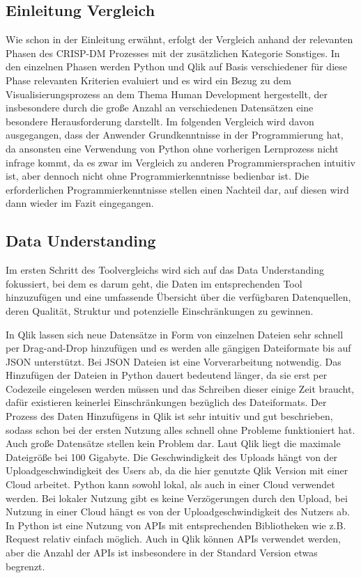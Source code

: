\documentclass[12pt]{article}
\begin{document}
	\subsection{Einleitung Vergleich}
	Wie schon in der Einleitung erwähnt, erfolgt der Vergleich anhand der relevanten Phasen des CRISP-DM Prozesses mit der zusätzlichen Kategorie Sonstiges. In den einzelnen Phasen werden Python und Qlik auf Basis verschiedener für diese Phase relevanten Kriterien evaluiert und es wird ein Bezug zu dem Visualisierungsprozess an dem Thema Human Development hergestellt, der insbesondere durch die große Anzahl an verschiedenen Datensätzen eine besondere Herausforderung darstellt. Im folgenden Vergleich wird davon ausgegangen, dass der Anwender Grundkenntnisse in der Programmierung hat, da ansonsten eine Verwendung von Python ohne vorherigen Lernprozess nicht infrage kommt, da es zwar im Vergleich zu anderen Programmiersprachen intuitiv ist, aber dennoch nicht ohne Programmierkenntnisse bedienbar ist. Die erforderlichen Programmierkenntnisse stellen einen Nachteil dar, auf diesen wird dann wieder im Fazit eingegangen.
	
	\subsection{Data Understanding}
	Im ersten Schritt des Toolvergleichs wird sich auf das Data Understanding fokussiert, bei dem es darum geht, die Daten im entsprechenden Tool hinzuzufügen und eine umfassende Übersicht über die verfügbaren Datenquellen, deren Qualität, Struktur und potenzielle Einschränkungen zu gewinnen.

	In Qlik lassen sich neue Datensätze in Form von einzelnen Dateien sehr schnell per Drag-and-Drop hinzufügen und es werden alle gängigen Dateiformate bis auf JSON unterstützt. Bei JSON Dateien ist eine Vorverarbeitung notwendig. Das Hinzufügen der Dateien in Python dauert bedeutend länger, da sie erst per Codezeile eingelesen werden müssen und das Schreiben dieser einige Zeit braucht, dafür existieren keinerlei Einschränkungen bezüglich des Dateiformats.
	Der Prozess des Daten Hinzufügens in Qlik ist sehr intuitiv und gut beschrieben, sodass schon bei der ersten Nutzung alles schnell ohne Probleme funktioniert hat. Auch große Datensätze stellen kein Problem dar. Laut Qlik liegt die maximale Dateigröße bei 100 Gigabyte. Die Geschwindigkeit des Uploads hängt von der Uploadgeschwindigkeit des Users ab, da die hier genutzte Qlik Version mit einer Cloud arbeitet. Python kann sowohl lokal, als auch in einer Cloud verwendet werden. Bei lokaler Nutzung gibt es keine Verzögerungen durch den Upload, bei Nutzung in einer Cloud hängt es von der Uploadgeschwindigkeit des Nutzers ab.
	In Python ist eine Nutzung von APIs mit entsprechenden Bibliotheken wie z.B. Request relativ einfach möglich.
	Auch in Qlik können APIs verwendet werden, aber die Anzahl der APIs ist insbesondere in der Standard Version etwas begrenzt.
	
\end{document}
